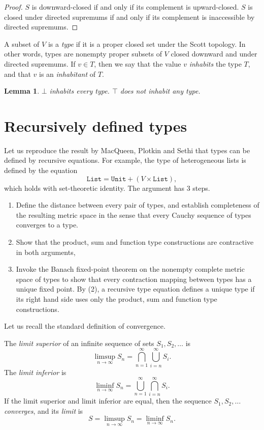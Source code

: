 \documentclass{amsart}
\newtheorem{lemma}[subsection]{Lemma}
\begin{document}
\begin{proof}
$S$ is downward-closed if and only if its complement is
upward-closed. $S$ is closed under directed supremums if and only
if its complement is inaccessible by directed supremums.
\end{proof}


A subset of $V$ is a \emph{type} if it is a proper closed set
under the Scott topology. In other words, types are nonempty
proper subsets of $V$ closed downward and under directed
supremums. If $v\in T$, then we say that the value $v$
\emph{inhabits} the type $T$, and that $v$ is an
\emph{inhabitant} of $T$.

\begin{lemma}
$\bot$ inhabits every type. $\top$ does not inhabit any type.
\end{lemma}

\section{Recursively defined types}


Let us reproduce the result by MacQueen, Plotkin and Sethi that
types can be defined by recursive equations. For example, the
type of heterogeneous lists is defined by the equation
\[
\texttt{List} = \texttt{Unit} + (V \times \texttt{List}),
\]
which holds with set-theoretic identity. The argument has 3
steps.
\begin{enumerate}
\item Define the distance between every pair of types, and
establish completeness of the resulting metric space in the sense
that every Cauchy sequence of types converges to a type.
\item Show that the product, sum and function type constructions
are contractive in both arguments,
\item Invoke the Banach fixed-point theorem on the nonempty
complete metric space of types to show that every contraction
mapping between types has a unique fixed point. By (2), a
recursive type equation defines a unique type if its right hand
side uses only the product, sum and function type constructions.
\end{enumerate}

Let us recall the standard definition of convergence.

The \emph{limit superior} of an infinite sequence of sets
$S_1,S_2,\ldots$ is
\[
\limsup_{n\rightarrow\infty}S_n =
\bigcap_{n=1}^\infty\bigcup_{i = n}^\infty S_i.
\]
The \emph{limit inferior} is
\[
\liminf_{n\rightarrow\infty}S_n =
\bigcup_{n=1}^\infty\bigcap_{i = n}^\infty S_i.
\]
If the limit superior and limit inferior are equal, then the
sequence $S_1,S_2,\ldots$ \emph{converges}, and its \emph{limit}
is
\[
S = \limsup_{n\rightarrow\infty}S_n = \liminf_{n\rightarrow\infty}S_n.
\]
\end{document}
